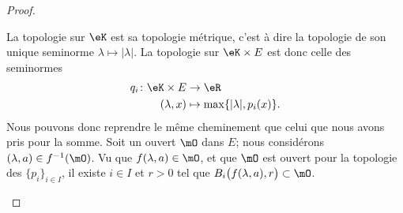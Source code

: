\begin{proof}
\begin{subproof}
		La topologie sur \( \eK\) est sa topologie métrique, c'est à dire la topologie de son unique seminorme \( \lambda\mapsto | \lambda |\). La topologie sur \( \eK\times E\) est donc celle des seminormes
		\begin{equation}        \label{EQooFSBEooWDsHot}
			\begin{aligned}
				q_i\colon \eK\times E & \to \eR                                \\
				(\lambda,x)           & \mapsto \max\{ | \lambda |, p_i(x) \}.
			\end{aligned}
		\end{equation}
		Nous pouvons donc reprendre le même cheminement que celui que nous avons pris pour la somme. Soit un ouvert \( \mO\) dans \( E\); nous considérons \( (\lambda, a)\in f^{-1}(\mO)\). Vu que \( f(\lambda, a)\in \mO\), et que \( \mO\) est ouvert pour la topologie des \( \{ p_i \}_{i\in I}\), il existe \( i\in I\) et \( r>0\) tel que \( B_i\big( f(\lambda,a), r \big)\subset\mO\).


\end{subproof}
\end{proof}
